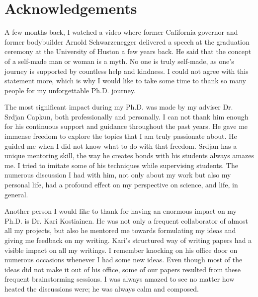 
\bigskip

\begingroup
\let\clearpage\relax
\let\cleardoublepage\relax
\let\cleardoublepage\relax
\chapter*{Acknowledgements}

\def\thanks#1{%
\begingroup
\leftskip1em
\noindent #1
\par
\endgroup
}

A few months back, I watched a video where former California governor and former bodybuilder Arnold Schwarzenegger delivered a speech at the graduation ceremony at the University of Huston a few years back. He said that the concept of a self-made man or woman is a myth. No one is truly self-made, as one's journey is supported by countless help and kindness. I could not agree with this statement more, which is why I would like to take some time to thank so many people for my unforgettable Ph.D. journey.


The most significant impact during my Ph.D. was made by my adviser Dr. Srdjan Capkun, both professionally and personally. I can not thank him enough for his continuous support and guidance throughout the past years. He gave me immense freedom to explore the topics that I am truly passionate about. He guided me when I did not know what to do with that freedom. Srdjan has a unique mentoring skill, the way he creates bonds with his students always amazes me. I tried to imitate some of his techniques while supervising students. The numerous discussion I had with him, not only about my work but also my personal life, had a profound effect on my perspective on science, and life, in general.


Another person I would like to thank for having an enormous impact on my Ph.D. is Dr. Kari Kostiainen. He was not only a frequent collaborator of almost all my projects, but also he mentored me towards formulating my ideas and giving me feedback on my writing.  Kari's structured way of writing papers had a visible impact on all my writings. I remember knocking on his office door on numerous occasions whenever I had some new ideas. Even though most of the ideas did not make it out of his office, some of our papers resulted from these frequent brainstorming sessions. I was always amazed to see no matter how heated the discussions were; he was always calm and composed.

